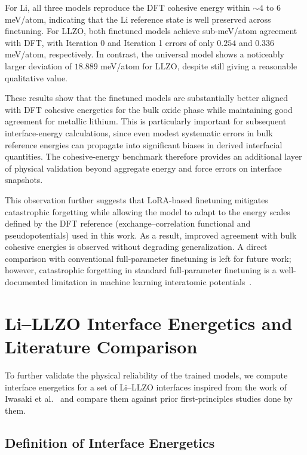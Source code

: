 \documentclass[12pt,a4paper,oneside]{book}
\begin{document}
For Li, all three models reproduce the DFT cohesive energy within \(\sim 4\) to \(6\) meV/atom, indicating that the Li reference state is well preserved across finetuning. For LLZO, both finetuned models achieve sub-meV/atom agreement with DFT, with Iteration 0 and Iteration 1 errors of only \(0.254\) and \(0.336\) meV/atom, respectively. In contrast, the universal model shows a noticeably larger deviation of \(18.889\) meV/atom for LLZO, despite still giving a reasonable qualitative value.

These results show that the finetuned models are substantially better aligned with DFT cohesive energetics for the bulk oxide phase while maintaining good agreement for metallic lithium. This is particularly important for subsequent interface-energy calculations, since even modest systematic errors in bulk reference energies can propagate into significant biases in derived interfacial quantities. The cohesive-energy benchmark therefore provides an additional layer of physical validation beyond aggregate energy and force errors on interface snapshots.

This observation further suggests that LoRA-based finetuning mitigates catastrophic forgetting while allowing the model to adapt to the energy scales defined by the DFT reference (exchange--correlation functional and pseudopotentials) used in this work. As a result, improved agreement with bulk cohesive energies is observed without degrading generalization. A direct comparison with conventional full-parameter finetuning is left for future work; however, catastrophic forgetting in standard full-parameter finetuning is a
well-documented limitation in machine learning interatomic potentials~\cite{Kim2025,Springer2025}.
\section{Li--LLZO Interface Energetics and Literature Comparison}
\label{sec:energetics}

To further validate the physical reliability of the trained models, we compute interface energetics for a set of Li--LLZO interfaces inspired from the work of Iwasaki et al.~\cite{Iwasaki2022DFT_Li_LLZO_PSSB} and compare them against prior first-principles studies done by them.

\subsection{Definition of Interface Energetics}
\label{sec:interface_energetics_def}
\end{document}
